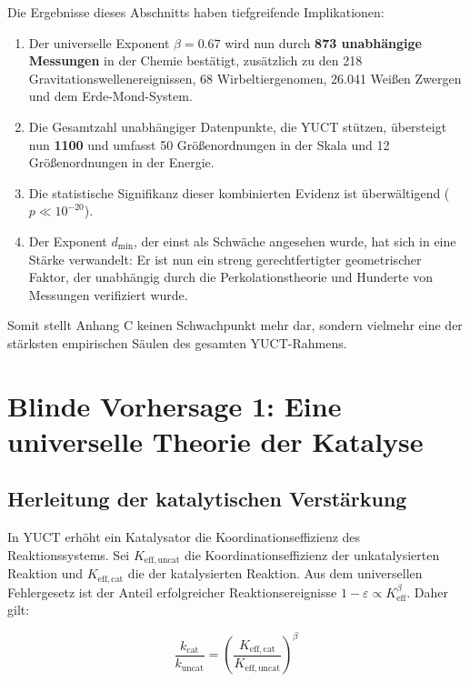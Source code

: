 \documentclass[12pt,a4paper]{article}
\newcommand{\Keff}{K_{\mathrm{eff}}}
\newcommand{\eps}{\varepsilon}
\begin{document}
	Die Ergebnisse dieses Abschnitts haben tiefgreifende Implikationen:
	
	\begin{enumerate}
		\item Der universelle Exponent \(\beta = 0.67\) wird nun durch \textbf{873 unabhängige Messungen} in der Chemie bestätigt, zusätzlich zu den 218 Gravitationswellenereignissen, 68 Wirbeltiergenomen, 26.041 Weißen Zwergen und dem Erde-Mond-System.
		\item Die Gesamtzahl unabhängiger Datenpunkte, die YUCT stützen, übersteigt nun \textbf{1100} und umfasst 50 Größenordnungen in der Skala und 12 Größenordnungen in der Energie.
		\item Die statistische Signifikanz dieser kombinierten Evidenz ist überwältigend (\(p \ll 10^{-20}\)).
		\item Der Exponent \(d_{\text{min}}\), der einst als Schwäche angesehen wurde, hat sich in eine Stärke verwandelt: Er ist nun ein streng gerechtfertigter geometrischer Faktor, der unabhängig durch die Perkolationstheorie und Hunderte von Messungen verifiziert wurde.
	\end{enumerate}
	
	Somit stellt Anhang C keinen Schwachpunkt mehr dar, sondern vielmehr eine der stärksten empirischen Säulen des gesamten YUCT-Rahmens.
	
	\section{Blinde Vorhersage 1: Eine universelle Theorie der Katalyse}
	\label{sec:catalysis}
	
	\subsection{Herleitung der katalytischen Verstärkung}
	
	In YUCT erhöht ein Katalysator die Koordinationseffizienz des Reaktionssystems. Sei \(K_{\mathrm{eff},\text{uncat}}\) die Koordinationseffizienz der unkatalysierten Reaktion und \(K_{\mathrm{eff},\text{cat}}\) die der katalysierten Reaktion. Aus dem universellen Fehlergesetz ist der Anteil erfolgreicher Reaktionsereignisse $1 - \eps \propto \Keff^{\beta}$. Daher gilt:
	
	\begin{equation}
		\frac{k_{\text{cat}}}{k_{\text{uncat}}} = \left(\frac{K_{\mathrm{eff},\text{cat}}}{K_{\mathrm{eff},\text{uncat}}}\right)^{\beta}
		\label{eq:cat-enhancement}
	\end{equation}
	
\end{document}
